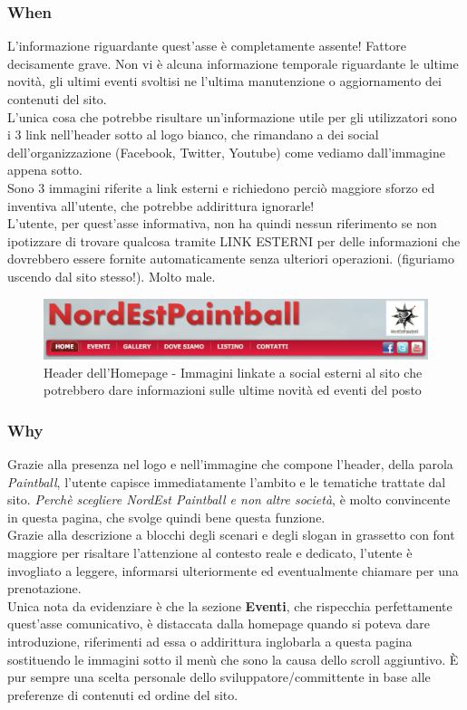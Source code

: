 \documentclass[../Relazione.tex]{subfiles}
\begin{document}
        \subsubsection{When}
        L'informazione riguardante quest'asse è completamente assente! Fattore decisamente grave.
        Non vi è alcuna informazione temporale riguardante le ultime novità, gli ultimi eventi svoltisi ne l'ultima manutenzione o aggiornamento dei contenuti del sito.\\
        L'unica cosa che potrebbe risultare un'informazione utile per gli utilizzatori sono i 3 link nell'header sotto al logo bianco, che rimandano a dei social dell'organizzazione (Facebook, Twitter, Youtube) come vediamo dall'immagine appena sotto.\\
        Sono 3 immagini riferite a link esterni e richiedono perciò maggiore sforzo ed inventiva all'utente, che potrebbe addirittura ignorarle!\\
        L'utente, per quest'asse informativa, non ha quindi nessun riferimento se non ipotizzare di trovare qualcosa tramite LINK ESTERNI per delle informazioni che dovrebbero essere fornite automaticamente senza ulteriori operazioni. (figuriamo uscendo dal sito stesso!).
        Molto male.

        \begin{figure}[!h]
            \centering
            \includegraphics[scale=0.3]{img/sito/Where.png}
            \caption{Header dell'Homepage - Immagini linkate a social esterni al sito che potrebbero dare informazioni sulle ultime novità ed eventi del posto}
            \label{fig:label}
        \end{figure}

        \subsubsection{Why}
        Grazie alla presenza nel logo e nell'immagine che compone l'header, della parola \emph{Paintball}, l’utente capisce immediatamente l’ambito e le tematiche trattate dal sito.
        \textit{Perchè scegliere NordEst Paintball e non altre società}, è molto convincente in questa pagina, che svolge quindi bene questa funzione.\\
        Grazie alla descrizione a blocchi degli scenari e degli slogan in grassetto con font maggiore per risaltare l'attenzione al contesto reale e dedicato, l'utente è invogliato a leggere, informarsi ulteriormente ed eventualmente chiamare per una prenotazione.\\
        Unica nota da evidenziare è che la sezione \textbf{Eventi}, che rispecchia perfettamente quest'asse comunicativo, è distaccata dalla homepage quando si poteva dare introduzione, riferimenti ad essa o addirittura inglobarla a questa pagina sostituendo le immagini sotto il menù che sono la causa dello scroll aggiuntivo. È pur sempre una scelta personale dello sviluppatore/committente in base alle preferenze di contenuti ed ordine del sito.
\end{document}
